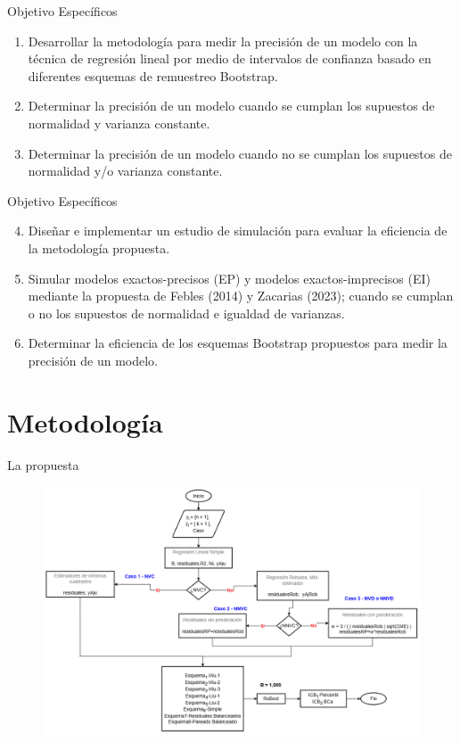 \documentclass[serif, aspectratio=169]{beamer}
\begin{document}
\begin{frame}{Objetivo Específicos}
\begin{enumerate}
	\item Desarrollar la metodología para medir la precisión de un modelo con la técnica de regresión lineal por medio de intervalos de confianza basado en diferentes esquemas de remuestreo Bootstrap.
	\item Determinar la precisión de un modelo cuando se cumplan los supuestos de normalidad y varianza constante.
	\item Determinar la precisión de un modelo cuando no se cumplan los supuestos de normalidad y/o varianza constante.
\end{enumerate}
\end{frame}


\begin{frame}{Objetivo Específicos}
 \begin{enumerate}
	\setcounter{enumi}{3}
	\item Diseñar e implementar un estudio de simulación para evaluar la eficiencia de la metodología propuesta.
	\item Simular modelos exactos-precisos (EP) y modelos exactos-imprecisos (EI) mediante la propuesta de Febles (2014) y Zacarias (2023); cuando se cumplan o no los supuestos de normalidad e igualdad de varianzas.
	\item Determinar la eficiencia de los esquemas Bootstrap propuestos para medir la precisión de un modelo.
\end{enumerate}
\end{frame}



\section{Metodología}

\begin{frame}{La propuesta}
	
	\begin{figure}[ht!]
		\centering 
		\includegraphics[width=0.75\linewidth]{recurso/metodoPresent_v8.png} 
		\label{fig:AlgDifEsqICBBoots}
	\end{figure}
	
\end{frame}
\end{document}
